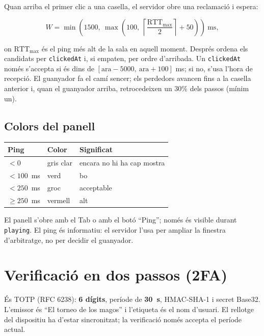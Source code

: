 \documentclass[10pt,a4paper]{article}
\begin{document}
Quan arriba el primer clic a una casella, el servidor obre una reclamació i espera:

\[
  W = \min\left(1500,\ \max\left(100,\ \left\lceil \frac{\mathrm{RTT}_{\max}}{2}
  \right\rceil + 50\right)\right)\ \text{ms},
\]

on $\mathrm{RTT}_{\max}$ és el ping més alt de la sala en aquell moment. Després ordena
els candidats per \texttt{clickedAt} i, si empaten, per ordre d'arribada. Un
\texttt{clickedAt} només s'accepta si és dins de $[\text{ara}-5000,\ \text{ara}+100]$
ms; si no, s'usa l'hora de recepció. El guanyador fa el camí sencer; els perdedors
avancen fins a la casella anterior i, quan el guanyador arriba, retrocedeixen un 30\%
dels passos (mínim un).

\subsection*{Colors del panell}

\begin{table}[ht]
\small
\begin{tabular}{@{}lll@{}}
\toprule
\textbf{Ping} & \textbf{Color} & \textbf{Significat} \\
\midrule
$< 0$ & gris clar & encara no hi ha cap mostra \\
$< 100$~ms & verd & bo \\
$< 250$~ms & groc & acceptable \\
$\geq 250$~ms & vermell & alt \\
\bottomrule
\end{tabular}
\end{table}

El panell s'obre amb el Tab o amb el botó \enquote{Ping}; només és visible durant
\texttt{playing}. El ping és informatiu: el servidor l'usa per ampliar la finestra
d'arbitratge, no per decidir el guanyador.

\section{Verificació en dos passos (2FA)}

És TOTP (RFC 6238): \textbf{6 dígits}, període de \textbf{30~s}, HMAC-SHA-1 i secret
Base32. L'emissor és \enquote{El torneo de los magos} i l'etiqueta és el nom d'usuari.
El rellotge del dispositiu ha d'estar sincronitzat; la verificació només accepta el
període actual.
\end{document}
